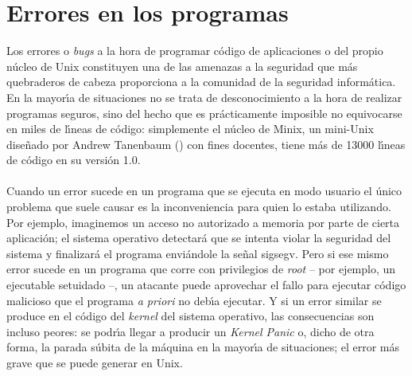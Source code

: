 \section{Errores en los programas}
\label{bufover}
Los errores o {\it bugs} a la hora de programar c\'odigo de aplicaciones o del 
propio 
n\'ucleo de Unix constituyen una de las amenazas a la seguridad que m\'as 
quebraderos de cabeza proporciona a la comunidad de la seguridad inform\'atica.
En la mayor\'{\i}a de situaciones no se trata de desconocimiento a la hora de
realizar programas seguros, sino del hecho que es pr\'acticamente imposible no
equivocarse en miles de l\'{\i}neas de c\'odigo: simplemente el n\'ucleo de 
Minix, un mini-Unix dise\~nado por Andrew Tanenbaum (\cite{kn:tan91}) con fines
docentes, tiene m\'as de 13000 l\'{\i}neas de c\'odigo en su versi\'on 1.0.\\
\\Cuando un error sucede en un programa que se ejecuta en modo usuario el 
\'unico problema que suele causar es la inconveniencia para quien lo estaba
utilizando. Por ejemplo, imaginemos un acceso no autorizado a memoria por parte 
de cierta aplicaci\'on; el sistema operativo detectar\'a que se intenta violar
la seguridad del sistema y finalizar\'a el programa envi\'andole la se\~nal {\sc
sigsegv}. Pero si ese mismo error sucede en un programa que corre con 
privilegios de {\it root} -- por ejemplo, un ejecutable setuidado --, un 
atacante puede aprovechar el fallo para ejecutar c\'odigo malicioso que el 
programa {\it a priori} no deb\'{\i}a ejecutar. Y si un error similar se
produce en el c\'odigo del {\it kernel} del sistema operativo, las consecuencias
son incluso peores: se podr\'{\i}a llegar a producir un {\it Kernel Panic} o,
dicho de otra forma, la parada s\'ubita de la m\'aquina en la mayor\'{\i}a de
situaciones; el error m\'as grave que se puede generar en Unix.
